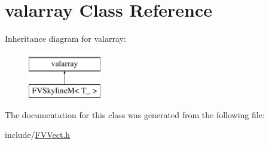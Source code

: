 \hypertarget{classvalarray}{
\section{valarray Class Reference}
\label{db/d52/classvalarray}
}
Inheritance diagram for valarray:\begin{figure}[H]
\begin{center}
\leavevmode
\includegraphics[height=2.000000cm]{db/d52/classvalarray}
\end{center}
\end{figure}


The documentation for this class was generated from the following file:\begin{DoxyCompactItemize}
\item 
include/\hyperlink{FVVect_8h}{FVVect.h}\end{DoxyCompactItemize}

